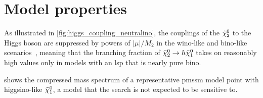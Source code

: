 \FloatBarrier


\section{Model properties}

As illustrated in \cref{fig:higgs_coupling_neutralino}, the couplings of the $\tilde{\chi}_2^0$ to the Higgs boson are suppressed by powers of $\vert\mu\vert/M_2$ in the wino-like and bino-like scenarios~\cite{Arbey:2012fa}, meaning that the branching fraction of $\tilde{\chi}_2^0 \rightarrow h \tilde{\chi}_1^0$ takes on reasonably high values only in models with an \gls{lsp} that is nearly pure bino.

 shows the compressed mass spectrum of a representative \gls{pmssm} model point with higgsino-like $\tilde{\chi}_1^0$, a model that the \onelepton search is not expected to be sensitive to.

